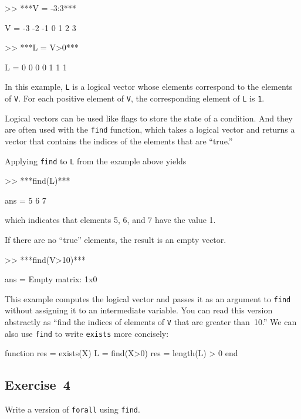 
\begin{code}
>> ***V = -3:3***

V = -3    -2    -1     0     1     2     3

>> ***L = V>0***

L =  0     0     0     0     1     1     1
\end{code}

In this example, \lstinline{L} is a logical vector whose elements
correspond to the elements of \lstinline{V}.  For each positive element of
\lstinline{V}, the corresponding element of \lstinline{L} is \lstinline{1}.

Logical vectors can be used like flags to store the state of
a condition.  And they are often used with the \lstinline{find} function,
which takes a logical vector and returns a vector that contains
the indices of the elements that are ``true.''


Applying \lstinline{find} to \lstinline{L} from the example above yields

\begin{code}
>> ***find(L)***

ans = 5     6     7
\end{code}
which indicates that elements 5, 6, and 7 have the value 1.

If there are no ``true'' elements, the result is an empty vector.

\begin{code}
>> ***find(V>10)***

ans = Empty matrix: 1x0
\end{code}

This example computes the logical vector and passes it as an
argument to \lstinline{find} without assigning it to an intermediate
variable.  You can read this version abstractly as ``find
the indices of elements of \lstinline{V} that are greater than~10.''
\newpage
We can also use \lstinline{find} to write \lstinline{exists} more concisely:

\begin{code}
function res = exists(X)
    L = find(X>0)
    res = length(L) > 0
end
\end{code}

\subsection{Exercise~4}
Write a version of \lstinline{forall} using \lstinline{find}.


